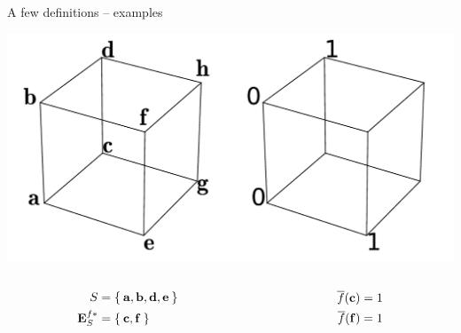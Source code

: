 \documentclass{beamer}
\begin{document}
\begin{frame}{A few definitions -- examples}
  \begin{center}
    \includegraphics[width=.7\textwidth]{figures/ae_example.pdf}
  \end{center}
  \begin{columns}
    \begin{column}{.5\textwidth}
      \begin{align*}
        S &= \Set{\mathbf{a}, \mathbf{b}, \mathbf{d}, \mathbf{e}}\\
        \mathbf{E}_{S}^{f*} &= \Set{\mathbf{c}, \mathbf{f}}
      \end{align*}
    \end{column}
    \begin{column}{.5\textwidth}
      \begin{align*}
        \overline{f}(\mathbf{c}) &= 1\\
         \overline{f}(\mathbf{f}) &= 1
      \end{align*}
    \end{column}
  \end{columns}
\end{frame}
\end{document}
